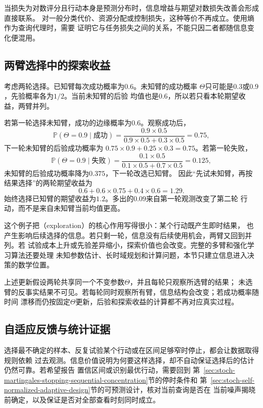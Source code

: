 当损失为对数评分且行动本身是预测分布时，信息增益与期望对数损失改善会形成直接联系。
对一般分类代价、资源分配或控制损失，这种等价不再成立。使用熵作为查询代理时，需要
证明它与任务损失之间的关系，不能只因二者都随信息变化便混用。

\subsection{两臂选择中的探索收益}
考虑两轮选择。已知臂每次成功概率为\(0.6\)。未知臂的成功概率
\(\Theta\)只可能是\(0.3\)或\(0.9\)，先验概率各为\(1/2\)。当前未知臂的后验
均值也是\(0.6\)，所以若只看本轮期望收益，两臂并列。

若第一轮选择未知臂，成功的边缘概率为\(0.6\)。观察成功后，
\[
  \mathbb{P}(\Theta=0.9\mid\text{成功})
  =
  \frac{0.9\times0.5}
       {0.9\times0.5+0.3\times0.5}
  =0.75,
\]
下一轮未知臂的后验成功概率为
\(0.75\times0.9+0.25\times0.3=0.75\)。若第一轮失败，
\[
  \mathbb{P}(\Theta=0.9\mid\text{失败})
  =
  \frac{0.1\times0.5}
       {0.1\times0.5+0.7\times0.5}
  =0.125,
\]
未知臂的后验成功概率降为\(0.375\)，下一轮改选已知臂。
因此“先试未知臂，再按结果选择”的两轮期望收益为
\begin{equation}
  0.6+
  0.6\times0.75+
  0.4\times0.6
  =
  1.29.
  \label{eq:decision-two-arm-information-value}
\end{equation}
始终选择已知臂的期望收益为\(1.2\)。多出的\(0.09\)来自第一轮观测改变了第二轮
行动，而不是来自未知臂当前均值更高。

这个例子把（exploration）的核心作用写得很小：某个行动既产生即时结果，
也产生影响后续选择的信息。若只剩一轮，信息没有后续使用机会，两臂又回到并列。若
试验成本上升或先验差异缩小，探索价值也会改变。完整的多臂和强化学习算法还要处理
未知参数估计、长时域规划和计算问题，本节只建立信息进入决策的数学位置。

上述更新假设两轮共享同一个不变参数\(\Theta\)，并且每轮只观察所选臂的结果；
未选臂的反事实结果不可见。若每轮同时观察所有臂，信息结构会改变；若成功概率随时间
漂移而仍按固定\(\Theta\)更新，后验和探索收益的计算都不再对应真实过程。

\subsection{自适应反馈与统计证据}
选择最不确定的样本、反复试验某个行动或在区间足够窄时停止，都会让数据取得规则依赖
过去观测。信息价值说明为何要这样选择，却不自动保证选择后的估计仍然可靠。若希望报告
置信区间或识别最优行动，需要回到
第~\ref{sec:stoch-martingales-stopping-sequential-concentration}节的停时条件和
第~\ref{sec:stoch-self-normalized-adaptive-design}节的可预测设计，核对当前查询是否在
当前噪声揭晓前确定，以及保证是否对全部查看时刻同时成立。

